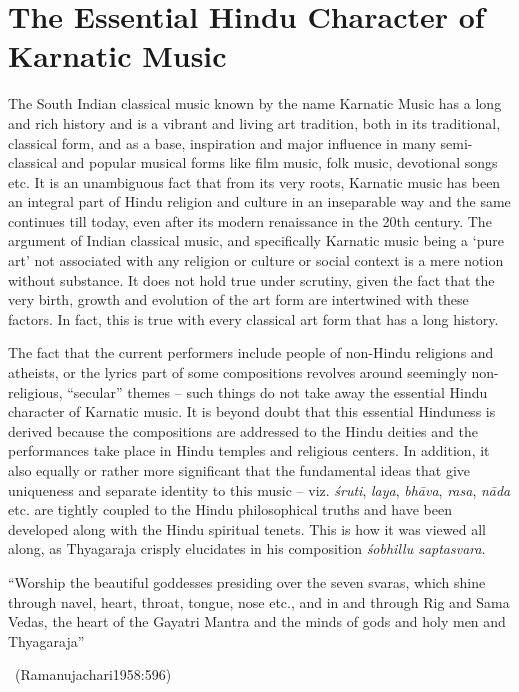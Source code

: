 \section*{The Essential Hindu Character of Karnatic Music}

The South Indian classical music known by the name Karnatic Music has a long and rich history and is a vibrant and living art tradition, both in its traditional, classical form, and as a base, inspiration and major influence in many semi-classical and popular musical forms like film music, folk music, devotional songs etc. It is an unambiguous fact that from its very roots, Karnatic music has been an integral part of Hindu religion and culture in an inseparable way and the same continues till today, even after its modern renaissance in the 20th century. The argument of Indian classical music, and specifically Karnatic music being a ‘pure art’ not associated with any religion or culture or social context is a mere notion without substance. It does not hold true under scrutiny, given the fact that the very birth, growth and evolution of the art form are intertwined with these factors. In fact, this is true with every classical art form that has a long history.

The fact that the current performers include people of non-Hindu religions and atheists, or the lyrics part of some compositions revolves around seemingly non-religious, “secular” themes – such things do not take away the essential Hindu character of Karnatic music. It is beyond doubt that this essential Hinduness is derived because the compositions are addressed to the Hindu deities and the performances take place in Hindu temples and religious centers. In addition, it also equally or rather more significant that the fundamental ideas that give uniqueness and separate identity to this music – viz. \textit{śruti}, \textit{laya}, \textit{bhāva}, \textit{rasa}, \textit{nāda} etc. are tightly coupled to the Hindu philosophical truths and have been developed along with the Hindu spiritual tenets. This is how it was viewed all along, as Thyagaraja crisply elucidates in his composition \textit{śobhillu saptasvara}.

\begin{myquote}
“Worship the beautiful goddesses presiding over the seven svaras, which shine through navel, heart, throat, tongue, nose etc., and in and through Rig and Sama Vedas, the heart of the Gayatri Mantra and the minds of gods and holy men and Thyagaraja” 

~\hfill (Ramanujachari1958:596)
\end{myquote}

